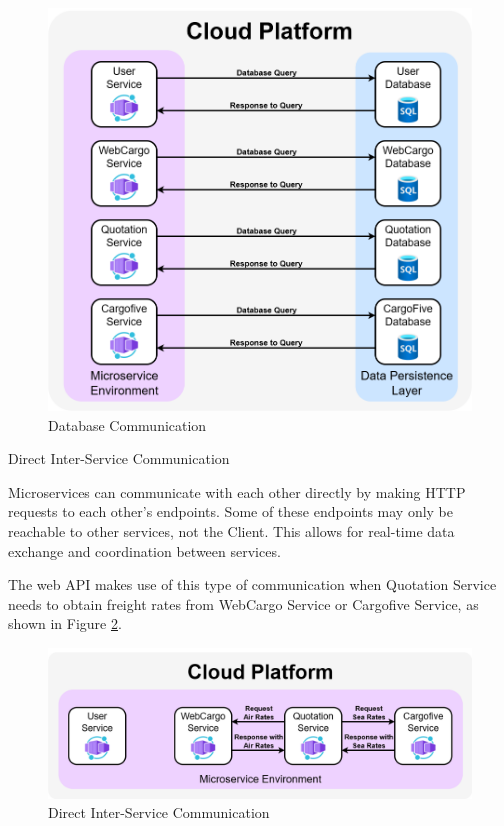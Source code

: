 \documentclass[12pt, reqno]{amsbook}
\makeatletter
\def\subsection{\@startsection{subsection}{2}%
      \z@{.5\linespacing\@plus.7\linespacing}{.25\linespacing}%
      {\normalfont\bfseries\flushleft}}
\theoremstyle{definition}
\theoremstyle{definition}
\numberwithin{section}{chapter}
\numberwithin{table}{chapter}
\numberwithin{figure}{chapter}
\makeatother
\begin{document}
\begin{figure}[H]
  \centering
  \includegraphics[width=0.9\linewidth]{images/DatabaseCommunication.png}
  \caption{\label{Figure:DatabaseCommunication}Database Communication}
\end{figure}

\subsection{Direct Inter-Service Communication}
\label{Subsection:Direct_Inter_Service_Communication}

Microservices can communicate with each other directly by making \ac{HTTP} requests to each other's endpoints. Some of these endpoints may only be reachable to other services, not the Client. This allows for real-time data exchange and coordination between services.

The web \ac{API} makes use of this type of communication when Quotation Service needs to obtain freight rates from WebCargo Service or Cargofive Service, as shown in Figure \ref{Figure:DirectCommunication}.

\begin{figure}[H]
  \centering
  \includegraphics[width=1\linewidth]{images/DirectCommunication.png}
  \caption{\label{Figure:DirectCommunication}Direct Inter-Service Communication}
\end{figure}
\end{document}
